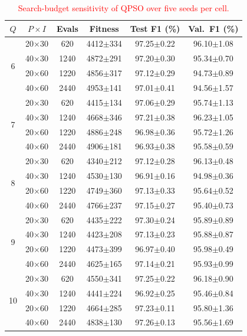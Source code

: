 \documentclass[conference]{IEEEtran}
\begin{document}
\begin{table}[!t]
\centering
\scriptsize
\caption{\textcolor{red}{Search-budget sensitivity of QPSO over five seeds per cell.}}
\label{tab:budget_sensitivity}
\color{red}
\setlength{\tabcolsep}{3pt}
\begin{tabular}{cccccc}
\hline\toprule
$Q$ & $P{\times}I$ & Evals & Fitness & Test F1 (\%) & Val.\ F1 (\%) \\
\hline\toprule
\multirow{4}{*}{6} & 20$\times$30 & 620 & 4412$\pm$334 & 97.25$\pm$0.22 & 96.10$\pm$1.08 \\
 & 40$\times$30 & 1240 & 4872$\pm$291 & 97.20$\pm$0.30 & 95.34$\pm$0.70 \\
 & 20$\times$60 & 1220 & 4856$\pm$317 & 97.12$\pm$0.29 & 94.73$\pm$0.89 \\
 & 40$\times$60 & 2440 & 4953$\pm$141 & 97.01$\pm$0.41 & 94.56$\pm$1.57 \\
\midrule
\multirow{4}{*}{7} & 20$\times$30 & 620 & 4415$\pm$134 & 97.06$\pm$0.29 & 95.74$\pm$1.13 \\
 & 40$\times$30 & 1240 & 4668$\pm$346 & 97.21$\pm$0.38 & 96.23$\pm$1.05 \\
 & 20$\times$60 & 1220 & 4886$\pm$248 & 96.98$\pm$0.36 & 95.72$\pm$1.26 \\
 & 40$\times$60 & 2440 & 4906$\pm$181 & 96.93$\pm$0.38 & 95.58$\pm$0.59 \\
\midrule
\multirow{4}{*}{8} & 20$\times$30 & 620 & 4340$\pm$212 & 97.12$\pm$0.28 & 96.13$\pm$0.48 \\
 & 40$\times$30 & 1240 & 4530$\pm$130 & 96.91$\pm$0.16 & 94.98$\pm$0.36 \\
 & 20$\times$60 & 1220 & 4749$\pm$360 & 97.13$\pm$0.33 & 95.64$\pm$0.52 \\
 & 40$\times$60 & 2440 & 4766$\pm$237 & 97.15$\pm$0.27 & 95.40$\pm$0.73 \\
\midrule
\multirow{4}{*}{9} & 20$\times$30 & 620 & 4435$\pm$222 & 97.30$\pm$0.24 & 95.89$\pm$0.89 \\
 & 40$\times$30 & 1240 & 4423$\pm$208 & 97.13$\pm$0.23 & 95.88$\pm$0.87 \\
 & 20$\times$60 & 1220 & 4473$\pm$399 & 96.97$\pm$0.40 & 95.98$\pm$0.49 \\
 & 40$\times$60 & 2440 & 4625$\pm$165 & 97.14$\pm$0.21 & 95.93$\pm$0.99 \\
\midrule
\multirow{4}{*}{10} & 20$\times$30 & 620 & 4550$\pm$341 & 97.25$\pm$0.22 & 96.18$\pm$0.90 \\
 & 40$\times$30 & 1240 & 4441$\pm$224 & 96.92$\pm$0.25 & 95.46$\pm$0.84 \\
 & 20$\times$60 & 1220 & 4664$\pm$285 & 97.23$\pm$0.11 & 95.80$\pm$1.36 \\
 & 40$\times$60 & 2440 & 4838$\pm$130 & 97.26$\pm$0.13 & 95.56$\pm$1.69 \\
\hline\toprule
\end{tabular}
\end{table}
\end{document}
